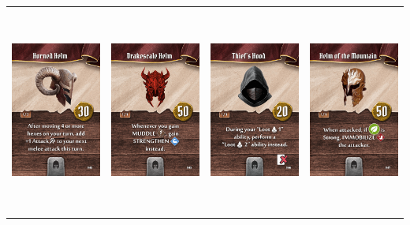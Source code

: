 \documentclass{minimal}
\begin{document}
{\begin{longtable}{llll}
\includegraphics[width=44mm,height=68mm]{./64-151/gh-107-horned-helm.png} &
\includegraphics[width=44mm,height=68mm]{./64-151/gh-108-drakescale-helm.png} &
\includegraphics[width=44mm,height=68mm]{./64-151/gh-109-thiefs-hood.png} &
\includegraphics[width=44mm,height=68mm]{./64-151/gh-110-helm-of-the-mountain.png}\\ 

\end{longtable}}
\end{document}
